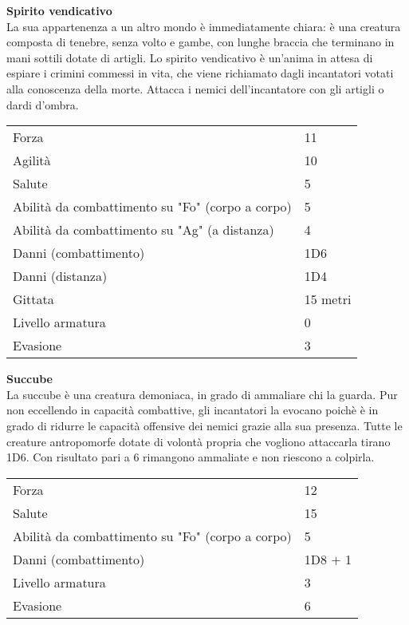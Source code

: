 \documentclass[../manuale_main.tex]{subfiles}
\begin{document}
\begin{center}
\clearpage

\textbf{Spirito vendicativo}\\
La sua appartenenza a un altro mondo è immediatamente chiara: è una creatura composta di tenebre, senza volto e gambe, con lunghe braccia che terminano in mani sottili dotate di artigli. Lo spirito vendicativo è un'anima in attesa di espiare i crimini commessi in vita, che viene richiamato dagli incantatori votati alla conoscenza della morte. Attacca i nemici dell'incantatore con gli artigli o dardi d'ombra.
\renewcommand{\arraystretch}{1.2}
\begin{tabularx}{\linewidth}{Q F}
Forza&11\\
Agilità&10\\
Salute&5\\
Abilità da combattimento su "Fo" (corpo a corpo)&5\\
Abilità da combattimento su "Ag" (a distanza)&4\\
Danni (combattimento)&1D6\\
Danni (distanza)&1D4\\
Gittata&15 metri\\
Livello armatura&0\\
Evasione&3\\
\end{tabularx}

\textbf{Succube}\\
La succube è una creatura demoniaca, in grado di ammaliare chi la guarda. Pur non eccellendo in capacità combattive, gli incantatori la evocano poichè è in grado di ridurre le capacità offensive dei nemici grazie alla sua presenza. Tutte le creature antropomorfe dotate di volontà propria che vogliono attaccarla tirano 1D6. Con risultato pari a 6 rimangono ammaliate e non riescono a colpirla.
\renewcommand{\arraystretch}{1.2}
\begin{tabularx}{\linewidth}{Q F}
Forza&12\\
Salute&15\\
Abilità da combattimento su "Fo" (corpo a corpo)&5\\
Danni (combattimento)&1D8 + 1\\
Livello armatura&3\\
Evasione&6\\
\end{tabularx}

\end{center}
\end{document}
